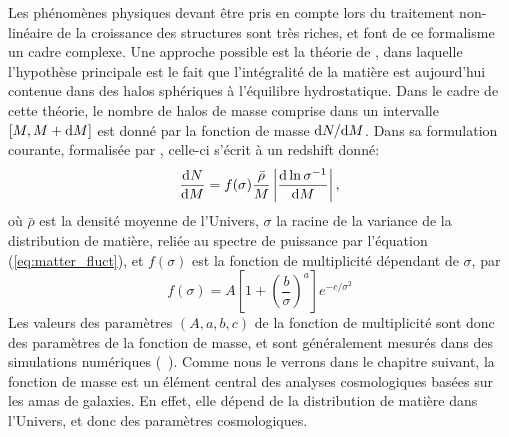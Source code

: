 Les phénomènes physiques devant être pris en compte lors du traitement non-linéaire de la croissance des structures sont très riches, et font de ce formalisme un cadre complexe.
Une approche possible est la théorie de , dans laquelle l'hypothèse principale est le fait que l'intégralité de la matière est aujourd'hui contenue dans des halos sphériques à l'équilibre hydrostatique.
Dans le cadre de cette théorie, le nombre de halos de masse comprise dans un intervalle $[M, M + \mathrm{d} M]$ est donné par la fonction de masse $\mathrm{d} N / \mathrm{d} M$.
Dans sa formulation courante, formalisée par , celle-ci s'écrit à un redshift donné:
\begin{equation}
    \label{eq:hmf}
    \frac{\mathrm{d} N}{\mathrm{d} M} = f(\sigma) \frac{\bar{\rho}}{M} \left| \frac{\mathrm{d} \, {\rm ln}\, \sigma^{-1}}{\mathrm{d} M} \right|,
\end{equation}
où $\bar{\rho}$ est la densité moyenne de l'Univers, $\sigma$ la racine de la variance de la distribution de matière, reliée au spectre de puissance par l'équation (\ref{eq:matter_fluct}), et $f(\sigma)$ est la fonction de multiplicité dépendant de $\sigma$, par
\begin{equation}
    f(\sigma) = A \left[ 1 + \left(\frac{b}{\sigma}\right)^a \right] e^{-c / \sigma^2}
\end{equation}
Les valeurs des paramètres $(A, a, b, c)$ de la fonction de multiplicité sont donc des paramètres de la fonction de masse, et sont généralement mesurés dans des simulations numériques (\eg\ \cite{tinker_toward_2008,bocquet_halo_2016,bocquet_mira-titan_2020}).
Comme nous le verrons dans le chapitre suivant, la fonction de masse est un élément central des analyses cosmologiques basées sur les amas de galaxies.
En effet, elle dépend de la distribution de matière dans l'Univers, et donc des paramètres cosmologiques.

